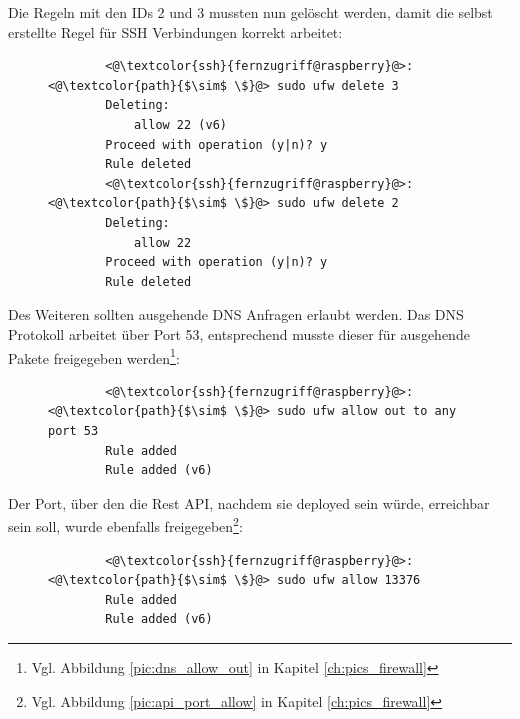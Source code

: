\documentclass[a4paper, 11pt]{scrartcl}
\begin{document}
Die Regeln mit den IDs 2 und 3 mussten nun gelöscht werden, damit die selbst erstellte Regel für SSH Verbindungen korrekt arbeitet:
\begin{figure}[H]
    \begin{mdframed}[backgroundcolor=bbg]
        \begin{lstlisting}
        <@\textcolor{ssh}{fernzugriff@raspberry}@>:<@\textcolor{path}{$\sim$ \$}@> sudo ufw delete 3
        Deleting:
            allow 22 (v6)
        Proceed with operation (y|n)? y
        Rule deleted
        <@\textcolor{ssh}{fernzugriff@raspberry}@>:<@\textcolor{path}{$\sim$ \$}@> sudo ufw delete 2
        Deleting:
            allow 22
        Proceed with operation (y|n)? y
        Rule deleted
        \end{lstlisting}
    \end{mdframed}
    \label{lst:firewall_delete_standard}
\end{figure}
Des Weiteren sollten ausgehende DNS Anfragen erlaubt werden. Das DNS Protokoll arbeitet über Port 53, entsprechend musste dieser für ausgehende
Pakete freigegeben werden\footnote{Vgl. Abbildung \ref{pic:dns_allow_out} in Kapitel \ref{ch:pics_firewall}}:
\begin{figure}[H]
    \begin{mdframed}[backgroundcolor=bbg]
        \begin{lstlisting}
        <@\textcolor{ssh}{fernzugriff@raspberry}@>:<@\textcolor{path}{$\sim$ \$}@> sudo ufw allow out to any port 53
        Rule added
        Rule added (v6)
        \end{lstlisting}
    \end{mdframed}
    \label{lst:firewall_allout_out_dns}
\end{figure}
Der Port, über den die Rest API, nachdem sie deployed sein würde, erreichbar sein soll, wurde ebenfalls freigegeben\footnote{Vgl. Abbildung \ref{pic:api_port_allow}  in Kapitel \ref{ch:pics_firewall}}:
\begin{figure}[H]
    \begin{mdframed}[backgroundcolor=bbg]
        \begin{lstlisting}
        <@\textcolor{ssh}{fernzugriff@raspberry}@>:<@\textcolor{path}{$\sim$ \$}@> sudo ufw allow 13376
        Rule added
        Rule added (v6)
        \end{lstlisting}
    \end{mdframed}
    \label{lst:firewall_allow_api}
\end{figure}
\end{document}
